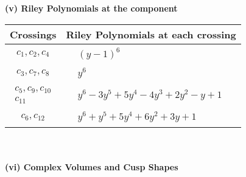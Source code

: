 \documentclass[1p]{elsarticle_modified}
\theoremstyle{definition}
\begin{document}
\newpage\renewcommand{\arraystretch}{1}
\flushleft \textbf{(v) Riley Polynomials at the component}\newline \\
\begin{tabular}{m{50pt}|m{274pt}}
Crossings & \hspace{64pt}Riley Polynomials at each crossing \\
\hline $$\begin{aligned}c_{1},c_{2},c_{4}\end{aligned}$$&$\begin{aligned}
&(y-1)^6
\end{aligned}$\\
\hline $$\begin{aligned}c_{3},c_{7},c_{8}\end{aligned}$$&$\begin{aligned}
&y^6
\end{aligned}$\\
\hline $$\begin{aligned}c_{5},c_{9},c_{10}\\c_{11}\end{aligned}$$&$\begin{aligned}
&y^6-3 y^5+5 y^4-4 y^3+2 y^2- y+1
\end{aligned}$\\
\hline $$\begin{aligned}c_{6},c_{12}\end{aligned}$$&$\begin{aligned}
&y^6+y^5+5 y^4+6 y^2+3 y+1
\end{aligned}$\\
\hline
\end{tabular}\\~\\
\newpage\flushleft \textbf{(vi) Complex Volumes and Cusp Shapes}
\end{document}
